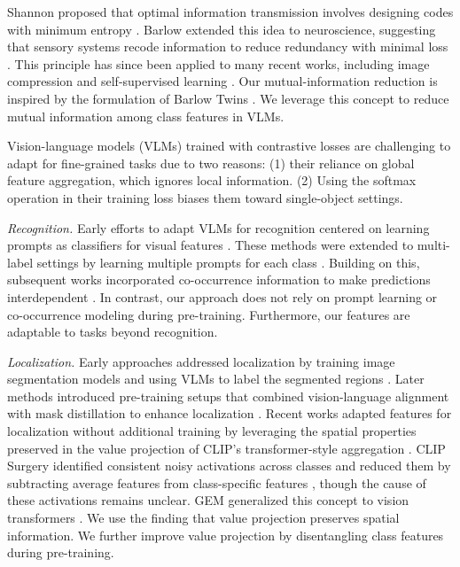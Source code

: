 

Shannon proposed that optimal information transmission involves designing codes with minimum entropy \cite{shannon1948mathematical}. Barlow extended this idea to neuroscience, suggesting that sensory systems recode information to reduce redundancy with minimal loss \cite{barlow}. This principle has since been applied to many recent works, including image compression \cite{balle2016end} and self-supervised learning \cite{barlowtwins}. Our mutual-information reduction is inspired by the formulation of Barlow Twins \cite{barlowtwins}. We leverage this concept to reduce mutual information among class features in VLMs.

\vspace{1mm}
Vision-language models (VLMs) trained with contrastive losses \cite{clip, align} are challenging to adapt for fine-grained tasks due to two reasons: (1) their reliance on global feature aggregation, which ignores local information. (2) Using the softmax operation in their training loss biases them toward single-object settings.

{\em Recognition.} 
Early efforts to adapt VLMs for recognition centered on learning prompts as classifiers for visual features \cite{coop}. These methods were extended to multi-label settings by learning multiple prompts for each class \cite{dualcoop,dualcoop++,PositiveCoOp}. Building on this, subsequent works incorporated co-occurrence information to make predictions interdependent \cite{scpnet,MLR-GCN}. In contrast, our approach does not rely on prompt learning or co-occurrence modeling during pre-training. Furthermore, our features are adaptable to tasks beyond recognition.

{\em Localization.} Early approaches addressed localization by training image segmentation models and using VLMs to label the segmented regions \cite{sam}. Later methods introduced pre-training setups that combined vision-language alignment with mask distillation to enhance localization \cite{dong2023maskclip}. Recent works adapted features for localization without additional training by leveraging the spatial properties preserved in the value projection of CLIP’s transformer-style aggregation \cite{maskclip}. CLIP Surgery \cite{clip_surgery} identified consistent noisy activations across classes and reduced them by subtracting average features from class-specific features \cite{clip_surgery}, though the cause of these activations remains unclear. GEM generalized this concept to vision transformers \cite{gem_walid}. We use the finding that value projection preserves spatial information. We further improve value projection by disentangling class features during pre-training.

